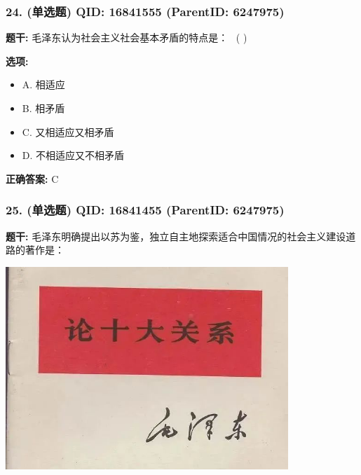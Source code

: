 \documentclass[12pt,UTF8]{ctexart}
\begin{document}
\vspace{0.3em}\hrulefill\vspace{0.7em}

\subsubsection*{24. (单选题) \small QID: 16841555 (ParentID: 6247975)}

\textbf{题干:}
毛泽东认为社会主义社会基本矛盾的特点是：  ( )



\textbf{选项:}
\begin{itemize}[leftmargin=*]

  \item A. 相适应

  \item B. 相矛盾

  \item C. 又相适应又相矛盾

  \item D. 不相适应又不相矛盾

\end{itemize}

\textbf{正确答案:}
C

\vspace{0.3em}\hrulefill\vspace{0.7em}

\subsubsection*{25. (单选题) \small QID: 16841455 (ParentID: 6247975)}

\textbf{题干:}
毛泽东明确提出以苏为鉴，独立自主地探索适合中国情况的社会主义建设道路的著作是：

\begin{center}\includegraphics[width=0.8\textwidth,keepaspectratio]{chapter_2551632_专题四_社会主义改造理论/unit_6247975_练习题二/question_16841455/title_img_1.png}\end{center}
\end{document}

